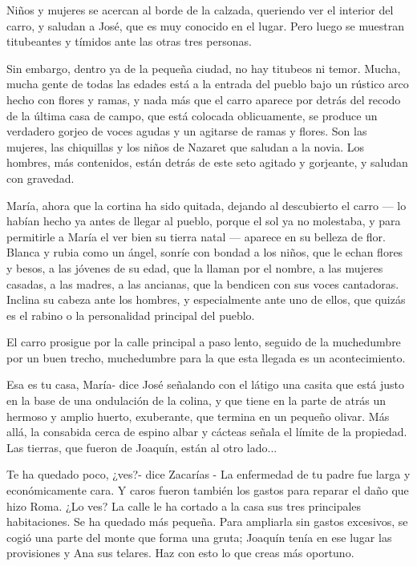 \documentclass[12pt, twoside, openright]{book} %
\begin{document}
Niños y mujeres se acercan al borde de la calzada, queriendo ver el interior del carro, y saludan a José, que es muy conocido en el lugar. Pero luego se muestran titubeantes y tímidos ante las otras tres personas. 

Sin embargo, dentro ya de la pequeña ciudad, no hay titubeos ni temor. Mucha, mucha gente de todas las edades está a la entrada del pueblo bajo un rústico arco hecho con flores y ramas, y nada más que el carro aparece por detrás del recodo de la última casa de campo, que está colocada oblicuamente, se produce un verdadero gorjeo de voces agudas y un agitarse de ramas y flores. Son las mujeres, las chiquillas y los niños de Nazaret que saludan a la novia. Los hombres, más contenidos, están detrás de este seto agitado y gorjeante, y saludan con gravedad. 

María, ahora que la cortina ha sido quitada, dejando al descubierto el carro — lo habían hecho ya antes de llegar al pueblo, porque el sol ya no molestaba, y para permitirle a María el ver bien su tierra natal — aparece en su belleza de flor. Blanca y rubia como un ángel, sonríe con bondad a los niños, que le echan flores y besos, a las jóvenes de su edad, que la llaman por el nombre, a las mujeres casadas, a las madres, a las ancianas, que la bendicen con sus voces cantadoras. Inclina su cabeza ante los hombres, y especialmente ante uno de ellos, que quizás es el rabino o la personalidad principal del pueblo. 

El carro prosigue por la calle principal a paso lento, seguido de la muchedumbre por un buen trecho, muchedumbre para la que esta llegada es un acontecimiento. 

Esa es tu casa, María- dice José señalando con el látigo una casita que está justo en la base de una ondulación de la colina, y que tiene en la parte de atrás un hermoso y amplio huerto, exuberante, que termina en un pequeño olivar. Más allá, la consabida cerca de espino albar y cácteas señala el límite de la propiedad. Las tierras, que fueron de Joaquín, están al otro lado... 

Te ha quedado poco, ¿ves?- dice Zacarías - La enfermedad de tu padre fue larga y económicamente cara. Y caros fueron también los gastos para reparar el daño que hizo Roma. ¿Lo ves? La calle le ha cortado a la casa sus tres principales habitaciones. Se ha quedado más pequeña. Para ampliarla sin gastos excesivos, se cogió una parte del monte que forma una gruta; Joaquín tenía en ese lugar las provisiones y Ana sus telares. Haz con esto lo que creas más oportuno. 
\end{document}
